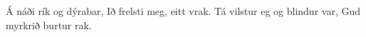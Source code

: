 Á náði rík og dýrabar,
Ið frelsti meg, eitt vrak.
Tá vilstur eg og blindur var,
Gud myrkrið burtur rak. 
